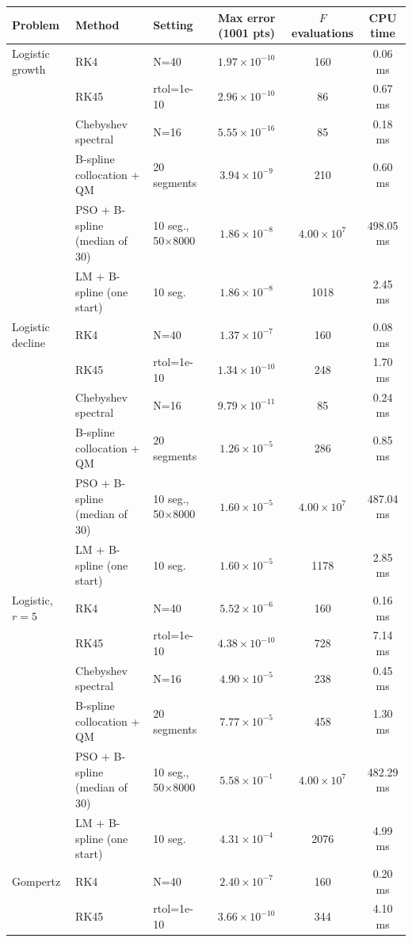 \begin{tabular}{lllccc}
\toprule
Problem & Method & Setting & Max error (1001 pts) & $F$ evaluations & CPU time\\
\midrule
Logistic growth & RK4 & N=40 & $1.97\times10^{-10}$ & 160 & 0.06 ms\\
 & RK45 & rtol=1e-10 & $2.96\times10^{-10}$ & 86 & 0.67 ms\\
 & Chebyshev spectral & N=16 & $5.55\times10^{-16}$ & 85 & 0.18 ms\\
 & B-spline collocation + QM & 20 segments & $3.94\times10^{-9}$ & 210 & 0.60 ms\\
 & PSO + B-spline (median of 30) & 10 seg., 50$\times$8000 & $1.86\times10^{-8}$ & $4.00\times10^{7}$ & 498.05 ms\\
 & LM + B-spline (one start) & 10 seg. & $1.86\times10^{-8}$ & 1018 & 2.45 ms\\
\addlinespace
Logistic decline & RK4 & N=40 & $1.37\times10^{-7}$ & 160 & 0.08 ms\\
 & RK45 & rtol=1e-10 & $1.34\times10^{-10}$ & 248 & 1.70 ms\\
 & Chebyshev spectral & N=16 & $9.79\times10^{-11}$ & 85 & 0.24 ms\\
 & B-spline collocation + QM & 20 segments & $1.26\times10^{-5}$ & 286 & 0.85 ms\\
 & PSO + B-spline (median of 30) & 10 seg., 50$\times$8000 & $1.60\times10^{-5}$ & $4.00\times10^{7}$ & 487.04 ms\\
 & LM + B-spline (one start) & 10 seg. & $1.60\times10^{-5}$ & 1178 & 2.85 ms\\
\addlinespace
Logistic, $r=5$ & RK4 & N=40 & $5.52\times10^{-6}$ & 160 & 0.16 ms\\
 & RK45 & rtol=1e-10 & $4.38\times10^{-10}$ & 728 & 7.14 ms\\
 & Chebyshev spectral & N=16 & $4.90\times10^{-5}$ & 238 & 0.45 ms\\
 & B-spline collocation + QM & 20 segments & $7.77\times10^{-5}$ & 458 & 1.30 ms\\
 & PSO + B-spline (median of 30) & 10 seg., 50$\times$8000 & $5.58\times10^{-1}$ & $4.00\times10^{7}$ & 482.29 ms\\
 & LM + B-spline (one start) & 10 seg. & $4.31\times10^{-4}$ & 2076 & 4.99 ms\\
\addlinespace
Gompertz & RK4 & N=40 & $2.40\times10^{-7}$ & 160 & 0.20 ms\\
 & RK45 & rtol=1e-10 & $3.66\times10^{-10}$ & 344 & 4.10 ms\\

\end{tabular}
